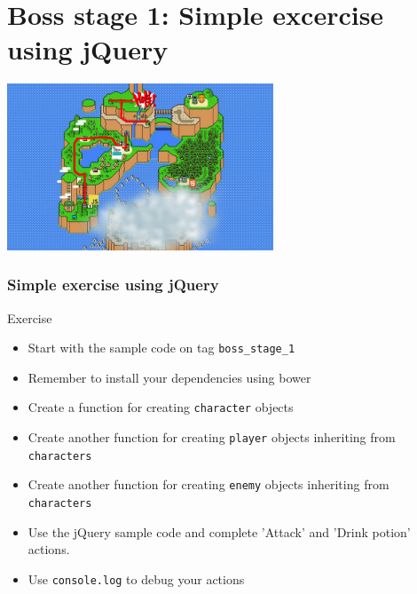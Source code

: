\section{Boss stage 1: Simple excercise using jQuery}

\begin{frame}[fragile]
  \begin{center}
    \includegraphics[width=300px]{images/map_boss_stage_1.png}
  \end{center}
\end{frame}

\begin{frame}[fragile]
  \frametitle{Simple exercise using jQuery}
  \begin{block}{Exercise}
    \begin{itemize}
      \item Start with the sample code on tag \texttt{boss\_stage\_1}
      \item Remember to install your dependencies using bower
      \item Create a function for creating \texttt{character} objects
      \item Create another function for creating \texttt{player} objects inheriting from \texttt{characters}
      \item Create another function for creating \texttt{enemy} objects inheriting from \texttt{characters}
      \item Use the jQuery sample code and complete 'Attack' and 'Drink potion' actions.
      \item Use \texttt{console.log} to debug your actions
    \end{itemize}
  \end{block}
\end{frame}
